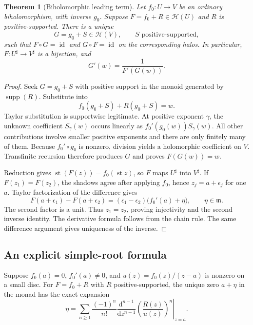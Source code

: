 \documentclass[11pt,letterpaper]{article}
\numberwithin{equation}{section}
\newtheorem{theorem}{Theorem}[section]
\theoremstyle{definition}
\theoremstyle{remark}
\newcommand{\mm}{\mathfrak{m}}
\newcommand{\HH}{\mathcal{H}}
\newcommand{\st}{\operatorname{st}}
\newcommand{\supp}{\operatorname{supp}}
\newcommand{\id}{\operatorname{id}}
\begin{document}
\begin{theorem}[Biholomorphic leading term]\label{thm:inverse}
Let $f_0:U\to V$ be an ordinary biholomorphism, with inverse $g_0$. Suppose
$F=f_0+R\in\HH(U)$ and $R$ is positive-supported. There is a unique
\[
 G=g_0+S\in\HH(V),\qquad S\text{ positive-supported},
\]
such that $F\circ G=\id$ and $G\circ F=\id$ on the corresponding halos.
In particular, $F:U^\sharp\to V^\sharp$ is a bijection, and
\[
 G'(w)=\frac1{F'(G(w))}.
\]
\end{theorem}
\begin{proof}
Seek $G=g_0+S$ with positive support in the monoid generated by $\supp(R)$.
Substitute into
\begin{equation}\label{eq:inverserecursion}
 f_0(g_0+S)+R(g_0+S)=w.
\end{equation}
Taylor substitution is supportwise legitimate. At positive exponent
$\gamma$, the unknown coefficient $S_\gamma(w)$ occurs linearly as
$f_0'(g_0(w))S_\gamma(w)$. All other contributions involve smaller positive
exponents and there are only finitely many of them. Because
$f_0'\circ g_0$ is nonzero, division yields a holomorphic coefficient on $V$.
Transfinite recursion therefore produces $G$ and proves $F(G(w))=w$.

Reduction gives $\st(F(z))=f_0(\st z)$, so $F$ maps $U^\sharp$ into
$V^\sharp$. If $F(z_1)=F(z_2)$, the shadows agree after applying $f_0$, hence
$z_j=a+\epsilon_j$ for one $a$. Taylor factorization of the difference gives
\[
 F(a+\epsilon_1)-F(a+\epsilon_2)
 = (\epsilon_1-\epsilon_2)\bigl(f_0'(a)+\eta\bigr),
 \qquad \eta\in\mm.
\]
The second factor is a unit. Thus $z_1=z_2$, proving injectivity and the
second inverse identity. The derivative formula follows from the chain rule.
The same difference argument gives uniqueness of the inverse.
\end{proof}

\subsection{An explicit simple-root formula}

Suppose $f_0(a)=0$, $f_0'(a)\ne0$, and
$u(z)=f_0(z)/(z-a)$ is nonzero on a small disc. For
$F=f_0+R$ with $R$ positive-supported, the unique zero $a+\eta$ in the monad
has the exact expansion
\begin{equation}\label{eq:lagrange}
 \eta=\sum_{n\ge1}\frac{(-1)^n}{n!}
 \left.\frac{\mathrm d^{n-1}}{\mathrm dz^{n-1}}
 \left(\frac{R(z)}{u(z)}\right)^n\right|_{z=a}.
\end{equation}
\end{document}
